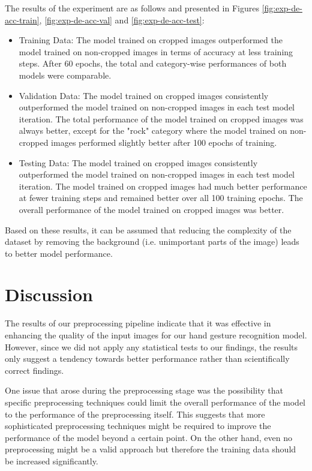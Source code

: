 \documentclass[a4paper]{article}
\begin{document}
The results of the experiment are as follows and presented in Figures \ref{fig:exp-de-acc-train}, \ref{fig:exp-de-acc-val} and \ref{fig:exp-de-acc-test}:
\begin{itemize}
	\item Training Data: The model trained on cropped images outperformed the model trained on non-cropped images in terms of accuracy at less training steps. After 60 epochs, the total and category-wise performances of both models were comparable.

    \item Validation Data: The model trained on cropped images consistently outperformed the model trained on non-cropped images in each test model iteration. The total performance of the model trained on cropped images was always better, except for the "rock" category where the model trained on non-cropped images performed slightly better after 100 epochs of training.

    \item Testing Data: The model trained on cropped images consistently outperformed the model trained on non-cropped images in each test model iteration. The model trained on cropped images had much better performance at fewer training steps and remained better over all 100 training epochs. The overall performance of the model trained on cropped images was better.

\end{itemize}
Based on these results, it can be assumed that reducing the complexity of the dataset by removing the background (i.e. unimportant parts of the image) leads to better model performance.

\section{Discussion}

The results of our preprocessing pipeline indicate that it was effective in enhancing the quality of the input images for our hand gesture recognition model. However, since we did not apply any statistical tests to our findings, the results only suggest a tendency towards better performance rather than scientifically correct findings.

One issue that arose during the preprocessing stage was the possibility that specific preprocessing techniques could limit the overall performance of the model to the performance of the preprocessing itself. This suggests that more sophisticated preprocessing techniques might be required to improve the performance of the model beyond a certain point. On the other hand, even no preprocessing might be a valid approach but therefore the training data should be increased significantly.
\end{document}
